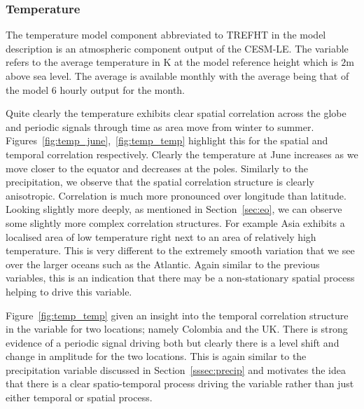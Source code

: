 \subsubsection{Temperature \label{sssec:temp}}
The temperature model component abbreviated to TREFHT in the model description is an atmospheric component output of the CESM-LE.
The variable refers to the average temperature in $\si{\kelvin}$ at the model reference height which is $2\si{\meter}$ above sea level.
The average is available monthly with the average being that of the model 6 hourly output for the month.

Quite clearly the temperature exhibits clear spatial correlation across the globe and periodic signals through time as area move from winter to summer.
Figures~\ref{fig:temp_june},~\ref{fig:temp_temp} highlight this for the spatial and temporal correlation respectively.
Clearly the temperature at June increases as we move closer to the equator and decreases at the poles. 
Similarly to the precipitation, we observe that the spatial correlation structure is clearly anisotropic. 
Correlation is much more pronounced over longitude than latitude. 
Looking slightly more deeply, as mentioned in Section~\ref{sec:eo}, we can observe some slightly more complex correlation structures. 
For example Asia exhibits a localised area of low temperature right next to an area of relatively high temperature. 
This is very different to the extremely smooth variation that we see over the larger oceans such as the Atlantic. 
Again similar to the previous variables, this is an indication that there may be a non-stationary spatial process helping to drive this variable.

Figure~\ref{fig:temp_temp} given an insight into the temporal correlation structure in the variable for two locations; namely Colombia and the UK. 
There is strong evidence of a periodic signal driving both but clearly there is a level shift and change in amplitude for the two locations. 
This is again similar to the precipitation variable discussed in Section~\ref{sssec:precip} and motivates the idea that there is a clear spatio-temporal process driving the variable rather than just either temporal or spatial process.

